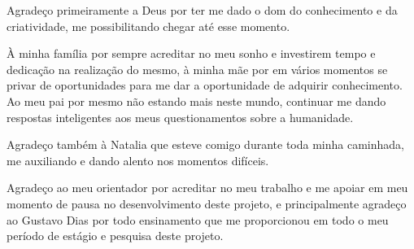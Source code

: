 \begin{agradecimentos}

Agradeço primeiramente a Deus por ter me dado o dom do conhecimento e da criatividade, me possibilitando chegar até esse momento.

À minha família por sempre acreditar no meu sonho e investirem tempo e dedicação na realização do mesmo, à minha mãe por em vários momentos se privar de oportunidades para me dar a oportunidade de adquirir conhecimento. Ao meu pai por mesmo não estando mais neste mundo, continuar me dando respostas inteligentes aos meus questionamentos sobre a humanidade.

Agradeço também à Natalia que esteve comigo durante toda minha caminhada, me auxiliando e dando alento nos momentos difíceis.

Agradeço ao meu orientador \imprimirorientador por acreditar no meu trabalho e me apoiar em meu momento de pausa no desenvolvimento deste projeto, e principalmente agradeço ao Gustavo Dias por todo ensinamento que me proporcionou em todo o meu período de estágio e pesquisa deste projeto.

\end{agradecimentos}